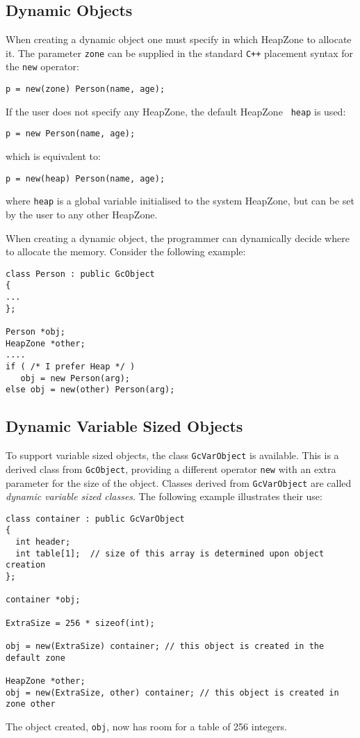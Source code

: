 \subsection{Dynamic Objects}

When creating a dynamic object one must specify in which HeapZone to
allocate it. The parameter {\tt zone} can be supplied in the standard
\verb|C++| placement syntax for the {\tt new} operator:
\begin{verbatim}
p = new(zone) Person(name, age); 
\end{verbatim}
If the user does not specify any HeapZone, the default HeapZone {\tt
heap} is used:
\begin{verbatim}
p = new Person(name, age);
\end{verbatim}
which is equivalent to:
\begin{verbatim}
p = new(heap) Person(name, age);
\end{verbatim}
where {\tt heap} is a global 
variable initialised to the system HeapZone, but can be set by the 
user to any other HeapZone.

When creating a dynamic object, the 
programmer can dynamically decide where to allocate the memory. 
Consider the following example:

\begin{verbatim}
class Person : public GcObject
{
...
};

Person *obj;
HeapZone *other;
....
if ( /* I prefer Heap */ )
   obj = new Person(arg);
else obj = new(other) Person(arg);
\end{verbatim}


\subsection{Dynamic Variable Sized Objects}

To support variable sized objects, the class {\tt GcVarObject} is
available.  This is a derived class from {\tt GcObject}, providing a
different operator {\tt new} with an extra parameter for the size of
the object.  Classes derived from {\tt GcVarObject} are called {\it
dynamic variable sized classes\/}.  The following example illustrates
their use:

\begin{verbatim}
class container : public GcVarObject
{
  int header;
  int table[1];  // size of this array is determined upon object creation
};

container *obj;

ExtraSize = 256 * sizeof(int);

obj = new(ExtraSize) container; // this object is created in the default zone

HeapZone *other;
obj = new(ExtraSize, other) container; // this object is created in zone other
\end{verbatim}
The object created, \verb|obj|, now has room for a table of 256 integers.

